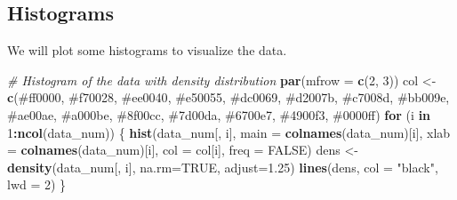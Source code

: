 \documentclass[
]{article}
\newenvironment{Shaded}{\begin{snugshade}}{\end{snugshade}}
\newcommand{\AttributeTok}[1]{\textcolor[rgb]{0.13,0.29,0.53}{#1}}
\newcommand{\CommentTok}[1]{\textcolor[rgb]{0.56,0.35,0.01}{\textit{#1}}}
\newcommand{\ConstantTok}[1]{\textcolor[rgb]{0.56,0.35,0.01}{#1}}
\newcommand{\ControlFlowTok}[1]{\textcolor[rgb]{0.13,0.29,0.53}{\textbf{#1}}}
\newcommand{\DecValTok}[1]{\textcolor[rgb]{0.00,0.00,0.81}{#1}}
\newcommand{\FloatTok}[1]{\textcolor[rgb]{0.00,0.00,0.81}{#1}}
\newcommand{\FunctionTok}[1]{\textcolor[rgb]{0.13,0.29,0.53}{\textbf{#1}}}
\newcommand{\NormalTok}[1]{#1}
\newcommand{\OtherTok}[1]{\textcolor[rgb]{0.56,0.35,0.01}{#1}}
\newcommand{\SpecialCharTok}[1]{\textcolor[rgb]{0.81,0.36,0.00}{\textbf{#1}}}
\newcommand{\StringTok}[1]{\textcolor[rgb]{0.31,0.60,0.02}{#1}}
\begin{document}
\subsection{Histograms}\label{histograms}

We will plot some histograms to visualize the data.

\begin{Shaded}
\begin{Highlighting}[]
\CommentTok{\# Histogram of the data with density distribution}
\FunctionTok{par}\NormalTok{(}\AttributeTok{mfrow =} \FunctionTok{c}\NormalTok{(}\DecValTok{2}\NormalTok{, }\DecValTok{3}\NormalTok{))}
\NormalTok{col }\OtherTok{\textless{}{-}} \FunctionTok{c}\NormalTok{(}\StringTok{\textquotesingle{}\#ff0000\textquotesingle{}}\NormalTok{, }\StringTok{\textquotesingle{}\#f70028\textquotesingle{}}\NormalTok{, }\StringTok{\textquotesingle{}\#ee0040\textquotesingle{}}\NormalTok{, }\StringTok{\textquotesingle{}\#e50055\textquotesingle{}}\NormalTok{, }\StringTok{\textquotesingle{}\#dc0069\textquotesingle{}}\NormalTok{,}
         \StringTok{\textquotesingle{}\#d2007b\textquotesingle{}}\NormalTok{, }\StringTok{\textquotesingle{}\#c7008d\textquotesingle{}}\NormalTok{, }\StringTok{\textquotesingle{}\#bb009e\textquotesingle{}}\NormalTok{, }\StringTok{\textquotesingle{}\#ae00ae\textquotesingle{}}\NormalTok{, }\StringTok{\textquotesingle{}\#a000be\textquotesingle{}}\NormalTok{,}
         \StringTok{\textquotesingle{}\#8f00cc\textquotesingle{}}\NormalTok{, }\StringTok{\textquotesingle{}\#7d00da\textquotesingle{}}\NormalTok{, }\StringTok{\textquotesingle{}\#6700e7\textquotesingle{}}\NormalTok{, }\StringTok{\textquotesingle{}\#4900f3\textquotesingle{}}\NormalTok{, }\StringTok{\textquotesingle{}\#0000ff\textquotesingle{}}\NormalTok{)}
\ControlFlowTok{for}\NormalTok{ (i }\ControlFlowTok{in} \DecValTok{1}\SpecialCharTok{:}\FunctionTok{ncol}\NormalTok{(data\_num)) \{}
  \FunctionTok{hist}\NormalTok{(data\_num[, i], }\AttributeTok{main =} \FunctionTok{colnames}\NormalTok{(data\_num)[i],}
       \AttributeTok{xlab =} \FunctionTok{colnames}\NormalTok{(data\_num)[i], }\AttributeTok{col =}\NormalTok{ col[i], }\AttributeTok{freq =} \ConstantTok{FALSE}\NormalTok{)}
\NormalTok{  dens }\OtherTok{\textless{}{-}} \FunctionTok{density}\NormalTok{(data\_num[, i], }\AttributeTok{na.rm=}\ConstantTok{TRUE}\NormalTok{, }\AttributeTok{adjust=}\FloatTok{1.25}\NormalTok{)}
  \FunctionTok{lines}\NormalTok{(dens, }\AttributeTok{col =} \StringTok{"black"}\NormalTok{, }\AttributeTok{lwd =} \DecValTok{2}\NormalTok{)}
\NormalTok{\}}
\end{Highlighting}
\end{Shaded}
\end{document}

